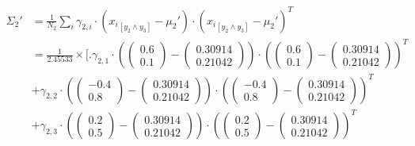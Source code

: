 \documentclass[12pt]{article}
\begin{document}
\begin{enumerate}[leftmargin=\labelsep]
        \begingroup
        \allowdisplaybreaks
        \begin{align*}
          \Sigma_2' & = \frac{1}{N_2} \sum_{i} \gamma_{2,i} \cdot \left({x_i}_{[y_2 \land y_3]} - \mu_2'\right) \cdot ({x_i}_{[y_2 \land y_3]} - \mu_2')^T                                                                                                             \\
                    & = \frac{1}{2.45533} \times \Bigg[ \Bigg.
          \gamma_{2,1} \cdot \left(\begin{pmatrix} 0.6 \\ 0.1 \end{pmatrix} - \begin{pmatrix} 0.30914 \\ 0.21042 \end{pmatrix}\right) \cdot \left(\begin{pmatrix} 0.6 \\ 0.1 \end{pmatrix} - \begin{pmatrix} 0.30914 \\ 0.21042 \end{pmatrix}\right)^T                 \\
                    & + \gamma_{2,2} \cdot \left(\begin{pmatrix} -0.4 \\ 0.8 \end{pmatrix} - \begin{pmatrix} 0.30914 \\ 0.21042 \end{pmatrix}\right) \cdot \left(\begin{pmatrix} -0.4 \\ 0.8 \end{pmatrix} - \begin{pmatrix} 0.30914 \\ 0.21042 \end{pmatrix}\right)^T \\
                    & + \gamma_{2,3} \cdot \left(\begin{pmatrix} 0.2 \\ 0.5 \end{pmatrix} - \begin{pmatrix} 0.30914 \\ 0.21042 \end{pmatrix}\right) \cdot \left(\begin{pmatrix} 0.2 \\ 0.5 \end{pmatrix} - \begin{pmatrix} 0.30914 \\ 0.21042 \end{pmatrix}\right)^T   \\

\end{align*}
\end{enumerate}
\end{document}
